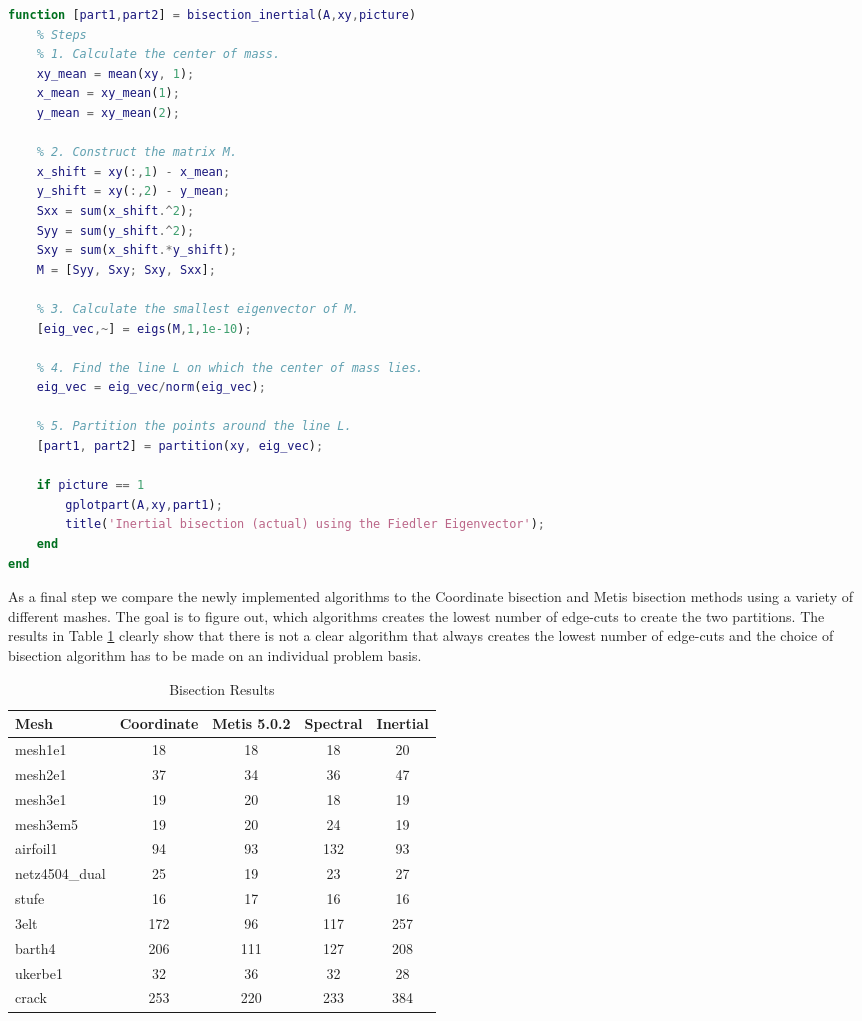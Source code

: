 \begin{lstlisting}[language=Matlab, caption=Inertial graph bisection implementation, label=lst:inert]
function [part1,part2] = bisection_inertial(A,xy,picture)
	% Steps
	% 1. Calculate the center of mass.
	xy_mean = mean(xy, 1);
	x_mean = xy_mean(1);
	y_mean = xy_mean(2);

	% 2. Construct the matrix M.
	x_shift = xy(:,1) - x_mean;
	y_shift = xy(:,2) - y_mean;
	Sxx = sum(x_shift.^2);
	Syy = sum(y_shift.^2);
	Sxy = sum(x_shift.*y_shift);
	M = [Syy, Sxy; Sxy, Sxx];
	
	% 3. Calculate the smallest eigenvector of M.
	[eig_vec,~] = eigs(M,1,1e-10);

	% 4. Find the line L on which the center of mass lies.
	eig_vec = eig_vec/norm(eig_vec);

	% 5. Partition the points around the line L.
	[part1, part2] = partition(xy, eig_vec);

	if picture == 1
		gplotpart(A,xy,part1);
		title('Inertial bisection (actual) using the Fiedler Eigenvector');
	end
end
\end{lstlisting}
As a final step we compare the newly implemented algorithms to the Coordinate bisection and Metis bisection methods using a variety of different mashes. The goal is to figure out, which algorithms creates the lowest number of edge-cuts to create the two partitions.
The results in Table \ref{tab:meshdata} clearly show that there is not a clear algorithm that always creates the lowest number of edge-cuts and the choice of bisection algorithm has to be made on an individual problem basis.


\begin{table}[H]
	\centering
	\begin{tabular}{lcccc}
		\toprule
		Mesh           & Coordinate & Metis 5.0.2 & Spectral & Inertial \\
		\midrule
		mesh1e1        & 18         & 18          & 18       & 20       \\
		mesh2e1        & 37         & 34          & 36       & 47       \\
		mesh3e1        & 19         & 20          & 18       & 19       \\
		mesh3em5       & 19         & 20          & 24       & 19       \\
		airfoil1       & 94         & 93          & 132      & 93       \\
		netz4504\_dual & 25         & 19          & 23       & 27       \\
		stufe          & 16         & 17          & 16       & 16       \\
		3elt           & 172        & 96          & 117      & 257      \\
		barth4         & 206        & 111         & 127      & 208      \\
		ukerbe1        & 32         & 36          & 32       & 28       \\
		crack          & 253        & 220         & 233      & 384      \\
		\bottomrule
	\end{tabular}
	\caption{Bisection Results}
	\label{tab:meshdata}
\end{table}


